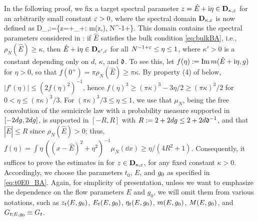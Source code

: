 In the following proof, we fix a target spectral parameter $z=\hat{E}+\mathrm{i} \eta\in \mathbf D_{\kappa,{\varepsilon}}$ for an arbitrarily small constant ${\varepsilon}>0$, where the spectral domain $\mathbf D_{\kappa,{\varepsilon}}$ is now defined as %
\be\label{eq:spectral_domainBA}
\mathbf D_{\kappa,\e}:=\{z=+\ii\eta \in \C_+: \im m(z,\ilambda)\ge \kappa, N^{-1+\e}\le \eta{}\}.
\ee
This domain contains the spectral parameters considered in : if $\hat E$ satisfies the bulk condition \eqref{eq:bulkBA}, i.e., $\rho_N(\hat E)\ge\kappa$, then $\hat E+\mathrm{i}\eta\in \mathbf D_{\kappa',{\varepsilon}}$ for all $N^{-1+{\varepsilon}}\le \eta\le 1$, where $\kappa'>0$ is a constant depending only on $d$, $\kappa$, and ${\mathfrak d}$. To see this, let $f(\eta):=\operatorname{{\mathrm{Im}}} m(\hat E+\mathrm{i}\eta,g)$ for $\eta>0$, so that $f(0^+)=\pi\rho_N(\hat E)\ge\pi\kappa$. By property (4) of  below, $|f'(\eta)|\le (2f(\eta)^2)^{-1}$, hence $f(\eta)^3\ge (\pi\kappa)^3-3\eta/2\ge(\pi\kappa)^3/2$ for $0<\eta\le (\pi\kappa)^3/3$. For $(\pi\kappa)^3/3\le\eta\le 1$, we use that $\mu_N$, being the free convolution of the semicircle law with a probability measure supported in $[-2dg,2dg]$, is supported in $[-R,R]$ with $R:=2+2dg\le 2+2d{\mathfrak d}^{-1}$, and that $|\hat E|\le R$ since $\rho_N(\hat E)>0$; thus, $f(\eta)=\int \eta\,(( x-\hat E)^2+\eta^2)^{-1}\mu_N(\dd x)\ge \eta/(4R^2+1)$. Consequently, it suffices to prove the estimates in  for $z\in\mathbf D_{\kappa,{\varepsilon}}$, for any fixed constant $\kappa>0$.
Accordingly, we choose the parameters $t_0$, $E$, and $g_0$ as specified in \eqref{eq:t0E0_BA}. %
Again, for simplicity of presentation, unless we want to emphasize the dependence on the flow parameters $E$ and $g_0$, we will omit them from various notations, such as $z_t(E,g_0)$, $E_t(E,g_0)$, $\eta_t(E,g_0)$, $m(E,g_0)$, $M(E,g_0)$, and $G_{t;E,g_0}\equiv G_t$. 

